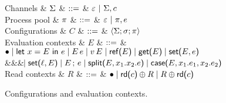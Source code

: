 \begin{figure*}
\centering
\begin{grammar}
  Channels
  & $\Sigma$ 
    & $\mathrel{::=}$ & $\varepsilon ~|~ \Sigma, c$
    \\[2mm]
  Process pool
  & $\pi$ 
    & $\mathrel{::=}$ & $\varepsilon ~|~ \pi, e$
    \\[2mm]
  Configurations
  & $C$
     & $\mathrel{::=}$ & $\left<\Sigma;\sigma;\pi\right> $
     \\[2mm]
 Evaluation contexts
  & $E$
     & $\mathrel{::=}$ & $\bullet \mathrel{\mid} \text{\textsf{let}}\ {x} = {E}\ \text{\textsf{in}}\ {e} \mathrel{\mid} E\,e \mathrel{\mid}
 v\,E \mathrel{\mid} \text{\textsf{ref}}\textsf{(}{E}\textsf{)} \mathrel{\mid} \text{\textsf{get}}\textsf{(}{E}\textsf{)} \mathrel{\mid} \text{\textsf{set}}\textsf{(}{E},{e}\textsf{)}$
     \\ &&& $\hspace{-1.02ex}\mathrel{\mid} \text{\textsf{set}}\textsf{(}{\ell},{E}\textsf{)} \mathrel{\mid} {E}\,;\,{e} \mathrel{\mid}
     \text{\textsf{split}}\textsf{(}{E},{x_1}.{x_2}.{e}\textsf{)} \mathrel{\mid} \text{\textsf{case}}\textsf{(}{E},{x_1}.{e_1},{x_2}.{e_2}\textsf{)}$
\\[2mm]
 Read contexts
  & $R$
     & $\mathrel{::=}$ & $\bullet \mathrel{\mid} \text{\textsf{rd}}\textsf{(}{c}\textsf{)} \oplus R \mathrel{\mid} R \oplus \text{\textsf{rd}}\textsf{(}{c}\textsf{)}$
\end{grammar}
\caption{Configurations and evaluation contexts. }
\label{fig:configs}
\end{figure*}


